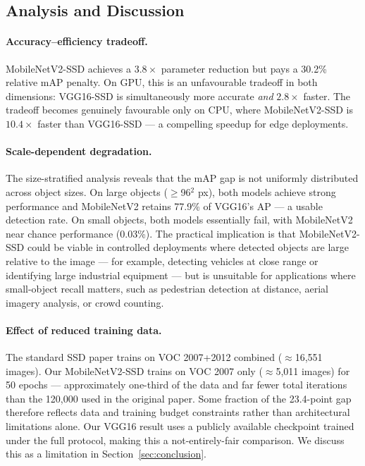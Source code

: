 \documentclass{article}
\begin{document}
\subsection{Analysis and Discussion}

\paragraph{Accuracy–efficiency tradeoff.}
MobileNetV2-SSD achieves a $3.8\times$ parameter reduction but pays a 30.2\% relative mAP penalty. On GPU, this is an unfavourable tradeoff in both dimensions: VGG16-SSD is simultaneously more accurate \emph{and} $2.8\times$ faster. The tradeoff becomes genuinely favourable only on CPU, where MobileNetV2-SSD is $10.4\times$ faster than VGG16-SSD — a compelling speedup for edge deployments.

\paragraph{Scale-dependent degradation.}
The size-stratified analysis reveals that the mAP gap is not uniformly distributed across object sizes. On large objects ($\geq$96$^2$ px), both models achieve strong performance and MobileNetV2 retains 77.9\% of VGG16's AP — a usable detection rate. On small objects, both models essentially fail, with MobileNetV2 near chance performance (0.03\%). The practical implication is that MobileNetV2-SSD could be viable in controlled deployments where detected objects are large relative to the image — for example, detecting vehicles at close range or identifying large industrial equipment — but is unsuitable for applications where small-object recall matters, such as pedestrian detection at distance, aerial imagery analysis, or crowd counting.

\paragraph{Effect of reduced training data.}
The standard SSD paper trains on VOC 2007+2012 combined ($\approx$16,551 images). Our MobileNetV2-SSD trains on VOC 2007 only ($\approx$5,011 images) for 50 epochs — approximately one-third of the data and far fewer total iterations than the 120,000 used in the original paper. Some fraction of the 23.4-point gap therefore reflects data and training budget constraints rather than architectural limitations alone. Our VGG16 result uses a publicly available checkpoint trained under the full protocol, making this a not-entirely-fair comparison. We discuss this as a limitation in Section~\ref{sec:conclusion}.
\end{document}
